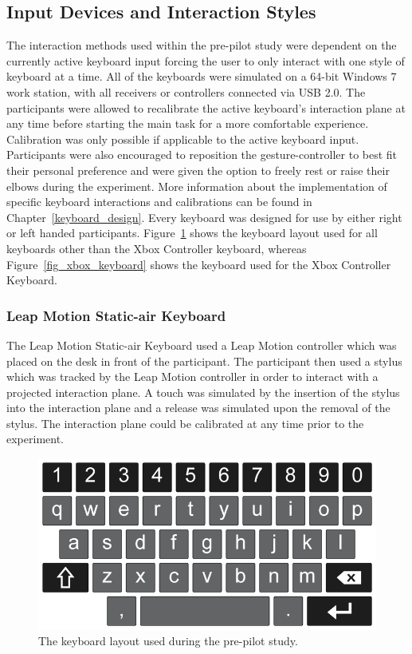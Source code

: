 \subsection{Input Devices and Interaction Styles}
The interaction methods used within the pre-pilot study were dependent on the currently active keyboard input forcing the user to only interact with one style of keyboard at a time. All of the keyboards were simulated on a 64-bit Windows 7 work station, with all receivers or controllers connected via USB 2.0. The participants were allowed to recalibrate the active keyboard's interaction plane at any time before starting the main task for a more comfortable experience. Calibration was only possible if applicable to the active keyboard input. Participants were also encouraged to reposition the gesture-controller to best fit their personal preference and were given the option to freely rest or raise their elbows during the experiment. More information about the implementation of specific keyboard interactions and calibrations can be found in Chapter~\ref{keyboard_design}. Every keyboard was designed for use by either right or left handed participants. Figure~\ref{fig_old_keyboard} shows the keyboard layout used for all keyboards other than the Xbox Controller keyboard, whereas Figure~\ref{fig_xbox_keyboard} shows the keyboard used for the Xbox Controller Keyboard.

\subsubsection{Leap Motion Static-air Keyboard}
The Leap Motion Static-air Keyboard used a Leap Motion controller which was placed on the desk in front of the participant. The participant then used a stylus which was tracked by the Leap Motion controller in order to interact with a projected interaction plane. A touch was simulated by the insertion of the stylus into the interaction plane and a release was simulated upon the removal of the stylus. The interaction plane could be calibrated at any time prior to the experiment.

\begin{figure}[h]
	\centering
	\includegraphics[width=6in]{Figures/fig_old_keyboard}
	\caption[Original Keyboard Layout]{The keyboard layout used during the pre-pilot study.}
	\label{fig_old_keyboard}
\end{figure}

